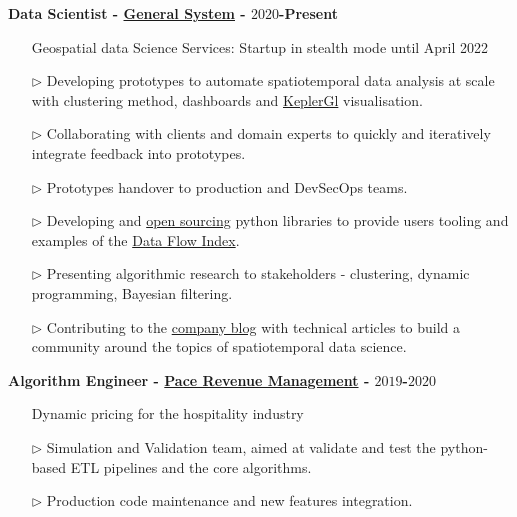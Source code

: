 \documentclass[margin,line]{resume}
\begin{document}
\begin{resume}
{\bf Data Scientist - \href{https://www.generalsystem.com/}{General System} - $2020$-Present} 
\vspace{0.1cm}
\begin{itemize}
    \item[] \hspace{-1.0cm} Geospatial data Science Services: Startup in stealth mode until April 2022
    \item[$\triangleright$] Developing prototypes to automate spatiotemporal data analysis at scale with clustering method, dashboards and \href{https://kepler.gl/}{KeplerGl} visualisation.
    \item[$\triangleright$] Collaborating with clients and domain experts to quickly and iteratively integrate feedback into prototypes.
    \item[$\triangleright$] Prototypes handover to production and DevSecOps teams.
    \item[$\triangleright$] Developing and \href{https://github.com/thegeneralsystem}{open sourcing} python libraries to provide users tooling and examples of the \href{https://assets.website-files.com/636ce900cf2e67aab6340642/643807134214aebc2b29849c_General%20System_The%20Data%20Flow%20Index%20Whitepaper%20_%20Nov%2022.pdf}{Data Flow Index}.
    \item[$\triangleright$] Presenting algorithmic research to stakeholders - clustering, dynamic programming, Bayesian filtering.
    \item[$\triangleright$] Contributing to the \href{https://www.generalsystem.com/blog}{company blog} with technical articles to build a community around the topics of spatiotemporal data science.
\end{itemize}


{\bf Algorithm Engineer - \href{https://www.paceup.com/}{Pace Revenue Management} - $2019$-$2020$} 
\vspace{0.1cm}
\begin{itemize}
    \item[] \hspace{-1.0cm} Dynamic pricing for the hospitality industry
    \item[$\triangleright$] Simulation and Validation team, aimed at validate and test the python-based ETL pipelines and the core algorithms.
    \item[$\triangleright$] Production code maintenance and new features integration.
\end{itemize}



\end{resume}
\end{document}
